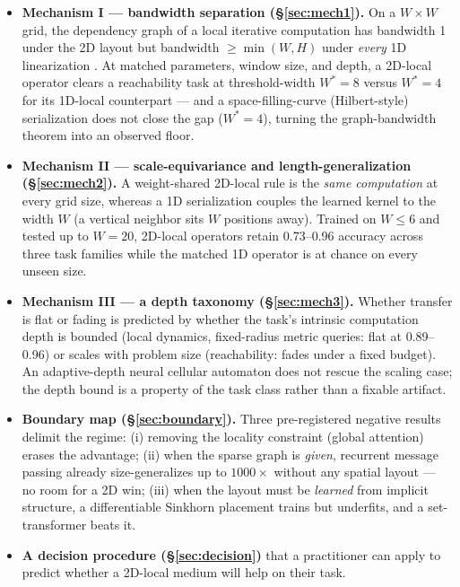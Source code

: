\documentclass[11pt]{article}
\newcommand{\Wstar}{W^{*}}
\begin{document}
\begin{itemize}
\item \textbf{Mechanism I --- bandwidth separation
  (\S\ref{sec:mech1}).} On a $W \times W$ grid, the dependency graph of a
  local iterative computation has bandwidth 1 under the 2D layout but
  bandwidth $\ge \min(W, H)$ under \emph{every} 1D linearization
  \citep{chvatalova1975optimal}. At matched parameters, window size, and
  depth, a 2D-local operator clears a reachability task at threshold-width
  $\Wstar = 8$ versus $\Wstar = 4$ for its 1D-local counterpart --- and a
  space-filling-curve (Hilbert-style) serialization does not close the gap
  ($\Wstar = 4$), turning the graph-bandwidth theorem into an observed floor.
\item \textbf{Mechanism II --- scale-equivariance and length-generalization
  (\S\ref{sec:mech2}).} A weight-shared 2D-local rule is the \emph{same
  computation} at every grid size, whereas a 1D serialization couples the
  learned kernel to the width $W$ (a vertical neighbor sits $W$ positions
  away). Trained on $W \le 6$ and tested up to $W = 20$, 2D-local operators
  retain 0.73--0.96 accuracy across three task families while the matched 1D
  operator is at chance on every unseen size.
\item \textbf{Mechanism III --- a depth taxonomy (\S\ref{sec:mech3}).} Whether
  transfer is flat or fading is predicted by whether the task's intrinsic
  computation depth is bounded (local dynamics, fixed-radius metric queries:
  flat at 0.89--0.96) or scales with problem size (reachability: fades under a
  fixed budget). An adaptive-depth neural cellular automaton does not rescue
  the scaling case; the depth bound is a property of the task class rather
  than a fixable artifact.
\item \textbf{Boundary map (\S\ref{sec:boundary}).} Three pre-registered
  negative results delimit the regime: (i) removing the locality constraint
  (global attention) erases the advantage; (ii) when the sparse graph is
  \emph{given}, recurrent message passing already size-generalizes up to
  $1000\times$ without any spatial layout \citep{groetschla2022recurrent} ---
  no room for a 2D win; (iii) when the layout must be \emph{learned} from
  implicit structure, a differentiable Sinkhorn placement trains but
  underfits, and a set-transformer beats it.
\item \textbf{A decision procedure (\S\ref{sec:decision})} that a
  practitioner can apply to predict whether a 2D-local medium will help on
  their task.
\end{itemize}
\end{document}
